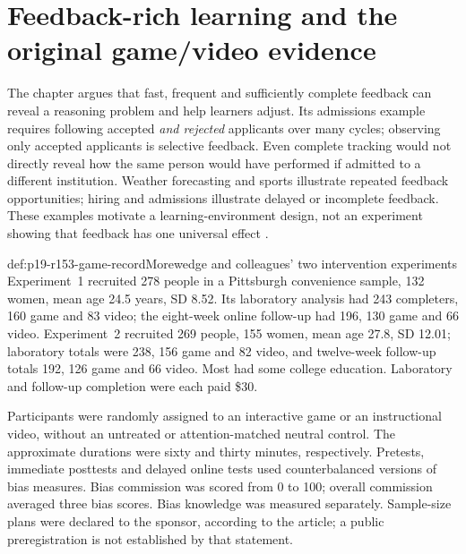 \section{Feedback-rich learning and the original game/video evidence}
\label{sec:p19-r153-games}

The chapter argues that fast, frequent and sufficiently complete feedback
can reveal a reasoning problem and help learners adjust. Its admissions
example requires following accepted \emph{and rejected} applicants over
many cycles; observing only accepted applicants is selective feedback.
Even complete tracking would not directly reveal how the same person
would have performed if admitted to a different institution. Weather
forecasting and sports illustrate repeated feedback opportunities;
hiring and admissions illustrate delayed or incomplete feedback.
These examples motivate a learning-environment design, not an experiment
showing that feedback has one universal effect
\cite[p.~804]{DeOliveiraNisbett2021Improve}.

\begin{hbdefinition}{def:p19-r153-game-record}{Morewedge and colleagues' two intervention experiments}
Experiment~1 recruited 278 people in a Pittsburgh convenience sample,
132 women, mean age 24.5 years, SD 8.52. Its laboratory analysis had
243 completers, 160 game and 83 video; the eight-week online follow-up
had 196, 130 game and 66 video. Experiment~2 recruited 269 people,
155 women, mean age 27.8, SD 12.01; laboratory totals were 238,
156 game and 82 video, and twelve-week follow-up totals 192,
126 game and 66 video. Most had some college education. Laboratory
and follow-up completion were each paid \$30.

Participants were randomly assigned to an interactive game or an
instructional video, without an untreated or attention-matched neutral
control. The approximate durations were sixty and thirty minutes,
respectively. Pretests, immediate posttests and delayed online tests
used counterbalanced versions of bias measures. Bias commission was
scored from 0 to 100; overall commission averaged three bias scores.
Bias knowledge was measured separately. Sample-size plans were declared
to the sponsor, according to the article; a public preregistration is
not established by that statement.
\end{hbdefinition}

